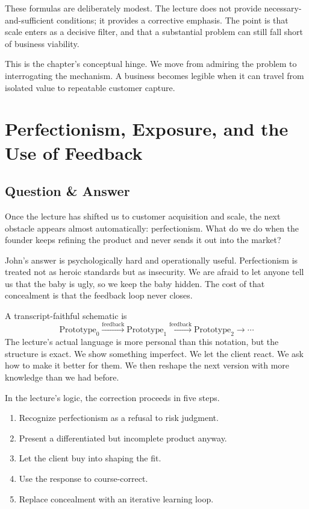 \begin{remark}
These formulas are deliberately modest. The lecture does not provide necessary-and-sufficient conditions; it provides a corrective emphasis. The point is that scale enters as a decisive filter, and that a substantial problem can still fall short of business viability.
\end{remark}

This is the chapter's conceptual hinge. We move from admiring the problem to interrogating the mechanism. A business becomes legible when it can travel from isolated value to repeatable customer capture.

\section{Perfectionism, Exposure, and the Use of Feedback}

\subsection{Question \& Answer}

Once the lecture has shifted us to customer acquisition and scale, the next obstacle appears almost automatically: perfectionism. What do we do when the founder keeps refining the product and never sends it out into the market?

John's answer is psychologically hard and operationally useful. Perfectionism is treated not as heroic standards but as insecurity. We are afraid to let anyone tell us that the baby is ugly, so we keep the baby hidden. The cost of that concealment is that the feedback loop never closes.

A transcript-faithful schematic is
\begin{equation}
\text{Prototype}_{0}
\xrightarrow{\text{feedback}}
\text{Prototype}_{1}
\xrightarrow{\text{feedback}}
\text{Prototype}_{2}
\rightarrow \cdots
\end{equation}
The lecture's actual language is more personal than this notation, but the structure is exact. We show something imperfect. We let the client react. We ask how to make it better for them. We then reshape the next version with more knowledge than we had before.

In the lecture's logic, the correction proceeds in five steps.
\begin{enumerate}
\item Recognize perfectionism as a refusal to risk judgment.
\item Present a differentiated but incomplete product anyway.
\item Let the client buy into shaping the fit.
\item Use the response to course-correct.
\item Replace concealment with an iterative learning loop.
\end{enumerate}

